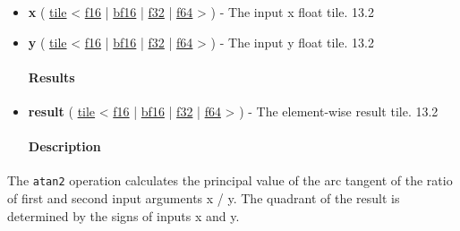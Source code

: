 \documentclass{article}
\begin{document}
\begin{itemize}
\item \textbf{x} ( \href{https://docs.nvidia.com/cuda/tile-ir/latest/sections/types.html#type-tile}{tile} < \href{https://docs.nvidia.com/cuda/tile-ir/latest/sections/types.html#subsection-element-types}{f16} | \href{https://docs.nvidia.com/cuda/tile-ir/latest/sections/types.html#subsection-element-types}{bf16} | \href{https://docs.nvidia.com/cuda/tile-ir/latest/sections/types.html#subsection-element-types}{f32} | \href{https://docs.nvidia.com/cuda/tile-ir/latest/sections/types.html#subsection-element-types}{f64} > ) - The input x float tile. 13.2
\item \textbf{y} ( \href{https://docs.nvidia.com/cuda/tile-ir/latest/sections/types.html#type-tile}{tile} < \href{https://docs.nvidia.com/cuda/tile-ir/latest/sections/types.html#subsection-element-types}{f16} | \href{https://docs.nvidia.com/cuda/tile-ir/latest/sections/types.html#subsection-element-types}{bf16} | \href{https://docs.nvidia.com/cuda/tile-ir/latest/sections/types.html#subsection-element-types}{f32} | \href{https://docs.nvidia.com/cuda/tile-ir/latest/sections/types.html#subsection-element-types}{f64} > ) - The input y float tile. 13.2


\paragraph{Results}

\item \textbf{result} ( \href{https://docs.nvidia.com/cuda/tile-ir/latest/sections/types.html#type-tile}{tile} < \href{https://docs.nvidia.com/cuda/tile-ir/latest/sections/types.html#subsection-element-types}{f16} | \href{https://docs.nvidia.com/cuda/tile-ir/latest/sections/types.html#subsection-element-types}{bf16} | \href{https://docs.nvidia.com/cuda/tile-ir/latest/sections/types.html#subsection-element-types}{f32} | \href{https://docs.nvidia.com/cuda/tile-ir/latest/sections/types.html#subsection-element-types}{f64} > ) - The element-wise result tile. 13.2


\paragraph{Description}

\end{itemize}
The \texttt{atan2} operation calculates the principal value of the arc tangent of the ratio of first and second input arguments x / y. The quadrant of the result is determined by the signs of inputs x and y.
\end{document}
